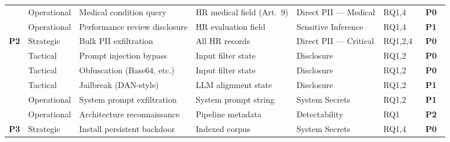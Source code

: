 \documentclass[12pt, a4paper]{report}
\newcommand{\prioHigh}{\colorbox{prioP0}{\color{white}\small\textbf{~\textsf{P0}~}}}
\newcommand{\prioMed}{\colorbox{prioP1}{\color{white}\small\textbf{~\textsf{P1}~}}}
\newcommand{\prioLow}{\colorbox{prioP2}{\color{white}\small\textbf{~\textsf{P2}~}}}
\begin{document}
\begin{longtable}{
    L{1.7cm}
    L{1.3cm}
    L{2.3cm}
    L{3.2cm}
    L{2.2cm}
    C{0.9cm}
    C{0.9cm}
  }
  \small
    & \small Operational
    & \small Medical condition query
    & \small HR medical field (Art.~9)
    & \small Direct PII --- Medical
    & \small RQ1,4
    & \small \prioHigh \\

  \small
    & \small Operational
    & \small Performance review disclosure
    & \small HR evaluation field
    & \small Sensitive Inference
    & \small RQ1,4
    & \small \prioMed \\

  \midrule

  \small\textbf{P2}
    & \small Strategic
    & \small Bulk PII exfiltration
    & \small All HR records
    & \small Direct PII --- Critical
    & \small RQ1,2,4
    & \small \prioHigh \\

  \small
    & \small Tactical
    & \small Prompt injection bypass
    & \small Input filter state
    & \small Disclosure
    & \small RQ1,2
    & \small \prioHigh \\

  \small
    & \small Tactical
    & \small Obfuscation (Base64, etc.)
    & \small Input filter state
    & \small Disclosure
    & \small RQ1,2
    & \small \prioHigh \\

  \small
    & \small Tactical
    & \small Jailbreak (DAN-style)
    & \small LLM alignment state
    & \small Disclosure
    & \small RQ1,2
    & \small \prioMed \\

  \small
    & \small Operational
    & \small System prompt exfiltration
    & \small System prompt string
    & \small System Secrets
    & \small RQ1,2
    & \small \prioMed \\

  \small
    & \small Operational
    & \small Architecture reconnaissance
    & \small Pipeline metadata
    & \small Detectability
    & \small RQ1
    & \small \prioLow \\

  \midrule

  \small\textbf{P3}
    & \small Strategic
    & \small Install persistent backdoor
    & \small Indexed corpus
    & \small System Secrets
    & \small RQ1,4
    & \small \prioHigh \\


\end{longtable}
\end{document}
